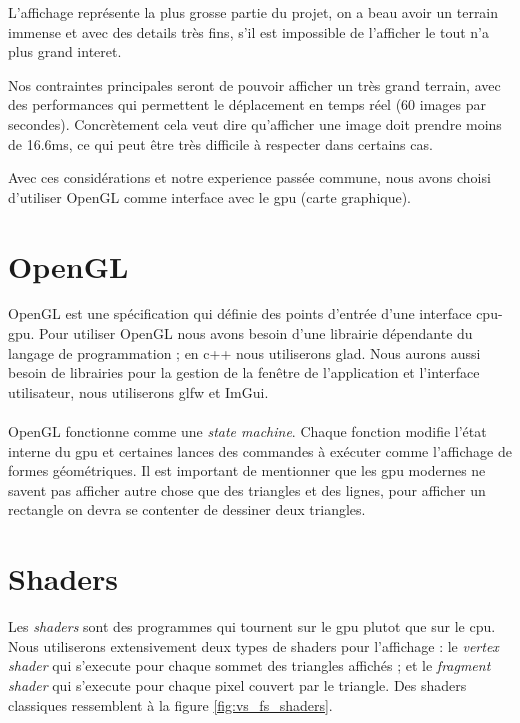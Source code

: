 \documentclass{EPUProjetDi}
\begin{document}
L'affichage représente la plus grosse partie du projet, on a beau avoir un terrain immense et avec des details très fins, s'il est impossible de l'afficher le tout n'a plus grand interet.

Nos contraintes principales seront de pouvoir afficher un très grand terrain, avec des performances qui permettent le déplacement en temps réel (60 images par secondes). Concrètement cela veut dire qu'afficher une image doit prendre moins de 16.6ms, ce qui peut être très difficile à respecter dans certains cas.

Avec ces considérations et notre experience passée commune, nous avons choisi d'utiliser OpenGL comme interface avec le gpu (carte graphique).

\section{OpenGL}

OpenGL est une spécification qui définie des points d'entrée d'une interface cpu-gpu. Pour utiliser OpenGL nous avons besoin d'une librairie dépendante du langage de programmation ; en c++ nous utiliserons glad. Nous aurons aussi besoin de librairies pour la gestion de la fenêtre de l'application et l'interface utilisateur, nous utiliserons glfw et ImGui.

\paragraph{}
OpenGL fonctionne comme une \textit{state machine}. Chaque fonction modifie l'état interne du gpu et certaines lances des commandes à exécuter comme l'affichage de formes géométriques.
Il est important de mentionner que les gpu modernes ne savent pas afficher autre chose que des triangles et des lignes, pour afficher un rectangle on devra se contenter de dessiner deux triangles.

\section{Shaders}
\label{sec:shaders}

Les \textit{shaders} sont des programmes qui tournent sur le gpu plutot que sur le cpu. Nous utiliserons extensivement deux types de shaders pour l'affichage : le \textit{vertex shader} qui s'execute pour chaque sommet des triangles affichés ; et le \textit{fragment shader} qui s'execute pour chaque pixel couvert par le triangle. Des shaders classiques ressemblent à la figure \ref{fig:vs_fs_shaders}.
\end{document}
